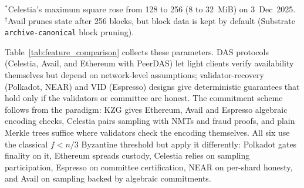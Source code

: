 \begin{table}[t]
\vspace{2pt}
\raggedright\footnotesize{$^\ast$Celestia's maximum square rose from 128 to 256 (8 to 32~MiB) on 3~Dec~2025. $^\dagger$Avail prunes state after 256 blocks, but block data is kept by default (Substrate \texttt{archive-canonical} block pruning).}
\end{table}

Table~\ref{tab:feature_comparison} collects these parameters.
DAS protocols (Celestia, Avail, and Ethereum with PeerDAS) let light clients verify availability themselves but depend on network-level assumptions; validator-recovery (Polkadot, NEAR) and VID (Espresso) designs give deterministic guarantees that hold only if the validators or committee are honest.
The commitment scheme follows from the paradigm: KZG gives Ethereum, Avail and Espresso algebraic encoding checks, Celestia pairs sampling with NMTs and fraud proofs, and plain Merkle trees suffice where validators check the encoding themselves.
All six use the classical $f < n/3$ Byzantine threshold but apply it differently: Polkadot gates finality on it, Ethereum spreads custody, Celestia relies on sampling participation, Espresso on committee certification, NEAR on per-shard honesty, and Avail on sampling backed by algebraic commitments.

